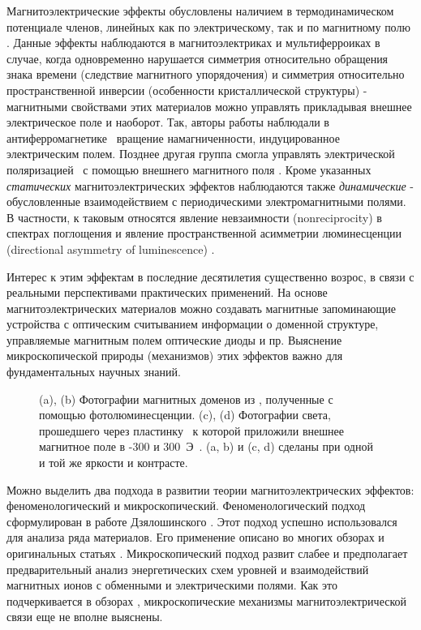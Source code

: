 {\actuality} Магнитоэлектрические эффекты обусловлены наличием в термодинамическом потенциале членов, линейных как по электрическому, так и по магнитному полю \autocite{Landau}. Данные эффекты наблюдаются в магнитоэлектриках и мультиферроиках в случае, когда одновременно нарушается симметрия относительно обращения знака времени (следствие магнитного упорядочения) и симметрия относительно пространственной инверсии (особенности кристаллической структуры) - магнитными свойствами этих материалов можно управлять прикладывая внешнее электрическое поле и наоборот. Так, авторы работы \autocite{Saito2008ape} наблюдали в антиферромагнетике \cbo\ вращение намагниченности, индуцированное электрическим полем. Позднее другая группа смогла управлять электрической поляризацией \ncbo\ с помощью внешнего магнитного поля \autocite{Khanh2013}. Кроме указанных \emph{статических} магнитоэлектрических эффектов наблюдаются также \emph{динамические} - обусловленные взаимодействием с периодическими электромагнитными полями. В частности, к таковым относятся явление невзаимности (nonreciprocity) в спектрах поглощения \autocite{Toyoda2015} и явление пространственной асимметрии люминесценции (directional asymmetry of luminescence) \autocite{Toyoda2016}.  

Интерес к этим эффектам в последние десятилетия существенно возрос, в связи с реальными перспективами практических применений. На основе магнитоэлектрических материалов можно создавать магнитные запоминающие устройства с оптическим считыванием информации о доменной структуре, управляемые магнитным полем оптические диоды и пр. Выяснение микроскопической природы (механизмов) этих эффектов важно для фундаментальных научных знаний.

\begin{figure}[ht]
	\caption{(a), (b) Фотографии магнитных доменов из \autocite{Toyoda2016}, полученные с помощью фотолюминесценции. (c), (d) Фотографии света, прошедшего через пластинку \cbo\, к которой приложили внешнее магнитное поле в -300 и 300~Э~\autocite{Saito2008jpsj}. (a, b) и (c, d) сделаны при одной и той же яркости и контрасте.}\label{fig:applications}
\end{figure}

Можно выделить два подхода в развитии теории магнитоэлектрических эффектов: феноменологический и микроскопический. Феноменологический подход сформулирован в работе Дзялошинского \autocite{Dzyaloshinskii1959}. Этот подход успешно использовался для анализа ряда материалов. Его применение описано во многих обзорах и оригинальных статьях \autocite{Zvezdin2008, Pyatakov2012, Popkov2016}. Микроскопический подход развит слабее и предполагает предварительный анализ энергетических схем уровней и взаимодействий магнитных ионов с обменными и электрическими полями. Как это подчеркивается в обзорах \autocite{Khomskii2009, Moskvin2009, Tokura2014, Shuai2015}, микроскопические механизмы магнитоэлектрической связи еще не вполне выяснены.

